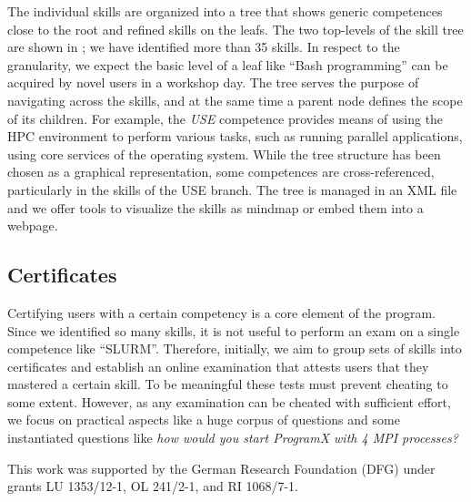 \documentclass[jocse]{jocseart}
\begin{document}
The individual skills are organized into a tree that shows generic competences close to the root and refined skills on the leafs.
The two top-levels of the skill tree are shown in ; we have identified more than 35 skills.
In respect to the granularity, we expect the basic level of a leaf like “Bash programming” can be acquired by novel users in a workshop day.
The tree serves the purpose of navigating across the skills, and at the same time a parent node defines the scope of its children.
For example, the \textit{USE} competence provides means of using the HPC environment to perform various tasks, such as running parallel applications, using core services of the operating system.
While the tree structure has been chosen as a graphical representation, some competences are cross-referenced, particularly in the skills of the USE branch.
The tree is managed in an XML file and we offer tools to visualize the skills as mindmap or embed them into a webpage.

\subsection{Certificates}

Certifying users with a certain competency is a core element of the program.
Since we identified so many skills, it is not useful to perform an exam on a single competence like “SLURM”.
Therefore, initially, we aim to group sets of skills into certificates and establish an online examination that attests users that they mastered a certain skill.
To be meaningful these tests must prevent cheating to some extent.
However, as any examination can be cheated with sufficient effort, we focus on practical aspects like a huge corpus of questions and some instantiated questions like \textit{how would you start ProgramX with 4 MPI processes?}




\appendix

\begin{acks}
\small
This work was supported by the German Research Foundation (DFG) under grants LU 1353/12-1, OL 241/2-1, and RI 1068/7-1.
\end{acks}



\end{document}
